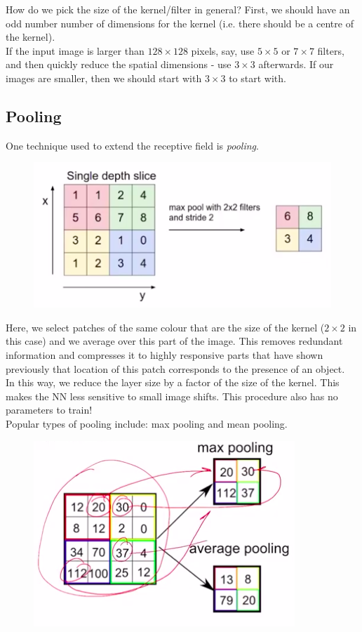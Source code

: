 \minirule

How do we pick the size of the kernel/filter in general? First, we should have an odd number number of dimensions for the kernel (i.e. there should be a centre of the kernel).\\

If the input image is larger than $128 \times 128$ pixels, say, use $5 \times 5$ or $7 \times 7$ filters, and then quickly reduce the spatial dimensions - use $3 \times 3$ afterwards. If our images are smaller, then we should start with $3 \times 3$ to start with.

\minirule

\subsection{Pooling}
One technique used to extend the receptive field is \textit{pooling}. 
\begin{figure}[H]
\centering
\includegraphics[scale=0.4]{pooling.png}
\end{figure}
Here, we select patches of the same colour that are the size of the kernel ($2 \times 2$ in this case) and we average over this part of the image. This removes redundant information and compresses it to highly responsive parts that have shown previously that location of this patch corresponds to the presence of an object.\\

In this way, we reduce the layer size by a factor of the size of the kernel. This makes the NN less sensitive to small image shifts. This procedure also has no parameters to train!\\

Popular types of pooling include: max pooling and mean pooling. 
\begin{figure}[H]
\centering
\includegraphics[scale=0.4]{maxmeanpooling.png}
\end{figure}



